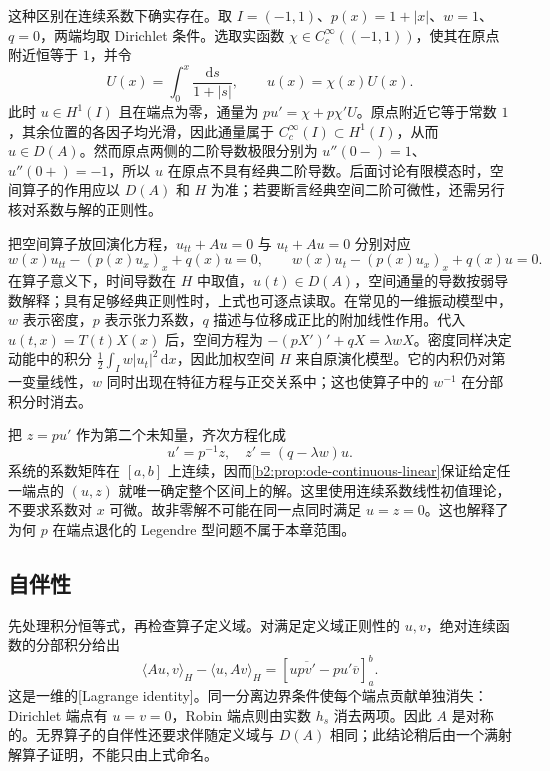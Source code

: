\ProseParagraphBreak

这种区别在连续系数下确实存在。取 \(I=(-1,1)\)、\(p(x)=1+|x|\)、\(w=1\)、\(q=0\)，两端均取 Dirichlet 条件。选取实函数 \(\chi\in C_c^\infty((-1,1))\)，使其在原点附近恒等于 \(1\)，并令
\[
 U(x)=\int_0^x\frac{\mathrm{d}s}{1+|s|},\qquad u(x)=\chi(x)U(x).
\]
此时 \(u\in H^1(I)\) 且在端点为零，通量为 \(pu'=\chi+p\chi'U\)。原点附近它等于常数 \(1\)，其余位置的各因子均光滑，因此通量属于 \(C_c^\infty(I)\subset H^1(I)\)，从而 \(u\in D(A)\)。然而原点两侧的二阶导数极限分别为 \(u''(0-)=1\)、\(u''(0+)=-1\)，所以 \(u\) 在原点不具有经典二阶导数。后面讨论有限模态时，空间算子的作用应以 \(D(A)\) 和 \(H\) 为准；若要断言经典空间二阶可微性，还需另行核对系数与解的正则性。

\ProseParagraphBreak

把空间算子放回演化方程，\(u_{tt}+Au=0\) 与 \(u_t+Au=0\) 分别对应
\[
 w(x)u_{tt}-(p(x)u_x)_x+q(x)u=0,
 \qquad
 w(x)u_t-(p(x)u_x)_x+q(x)u=0.
\]
在算子意义下，时间导数在 \(H\) 中取值，\(u(t)\in D(A)\)，空间通量的导数按弱导数解释；具有足够经典正则性时，上式也可逐点读取。在常见的一维振动模型中，\(w\) 表示密度，\(p\) 表示张力系数，\(q\) 描述与位移成正比的附加线性作用。代入 \(u(t,x)=T(t)X(x)\) 后，空间方程为 \(-(pX')'+qX=\lambda wX\)。密度同样决定动能中的积分 \(\frac12\int_I w|u_t|^2\,\mathrm{d}x\)，因此加权空间 \(H\) 来自原演化模型。它的内积仍对第一变量线性，\(w\) 同时出现在特征方程与正交关系中；这也使算子中的 \(w^{-1}\) 在分部积分时消去。

\ProseParagraphBreak

把 \(z=pu'\) 作为第二个未知量，齐次方程化成
\begin{equation}\label{b2:eq:10-first-order-system}
 u'=p^{-1}z,
 \quad z'=(q-\lambda w)u.
\end{equation}
系统的系数矩阵在 \([a,b]\) 上连续，因而\cref{b2:prop:ode-continuous-linear}保证给定任一端点的 \((u,z)\) 就唯一确定整个区间上的解。这里使用连续系数线性初值理论，不要求系数对 \(x\) 可微。故非零解不可能在同一点同时满足 \(u=z=0\)。这也解释了为何 \(p\) 在端点退化的 Legendre 型问题不属于本章范围。

\subsection{自伴性}
\label{b2:subsec:100202}

先处理积分恒等式，再检查算子定义域。对满足定义域正则性的 \(u,v\)，绝对连续函数的分部积分给出
\begin{equation}\label{b2:eq:10-lagrange-identity}
 \langle Au,v\rangle_H-\langle u,Av\rangle_H
 =\left[u\overline{pv'}-pu'\overline v\right]_a^b.
\end{equation}
这是一维的[Lagrange identity]。同一分离边界条件使每个端点贡献单独消失：Dirichlet 端点有 \(u=v=0\)，Robin 端点则由实数 \(h_s\) 消去两项。因此 \(A\) 是对称的。无界算子的自伴性还要求伴随定义域与 \(D(A)\) 相同；此结论稍后由一个满射解算子证明，不能只由上式命名。


